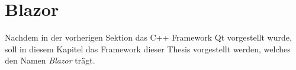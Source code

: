 \chapter{Blazor}
\label{sec:blazor}
Nachdem in der vorherigen Sektion das C++ Framework Qt vorgestellt wurde, soll in diesem
Kapitel das Framework dieser Thesis vorgestellt werden, welches den Namen \emph{Blazor} trägt.





